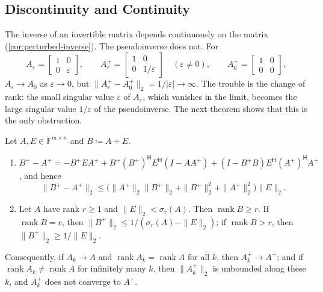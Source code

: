 \subsection{Discontinuity and Continuity}
\label{sec:pinv-continuity}

The inverse of an invertible matrix depends continuously on the matrix (\cref{cor:perturbed-inverse}). The pseudoinverse does not. For
\[
A_\varepsilon=\begin{bmatrix}1&0\\0&\varepsilon\end{bmatrix},\qquad A_\varepsilon^+=\begin{bmatrix}1&0\\0&1/\varepsilon\end{bmatrix}\quad(\varepsilon\ne0),\qquad A_0^+=\begin{bmatrix}1&0\\0&0\end{bmatrix},
\]
$A_\varepsilon\to A_0$ as $\varepsilon\to0$, but $\|A_\varepsilon^+-A_0^+\|_2=1/|\varepsilon|\to\infty$. The trouble is the change of rank: the small singular value $\varepsilon$ of $A_\varepsilon$, which vanishes in the limit, becomes the large singular value $1/\varepsilon$ of the pseudoinverse. The next theorem shows that this is the only obstruction.

\begin{theorem}
\label{thm:pinv-perturbation}
Let $A,E\in\mathbb F^{m\times n}$ and $B\coloneqq A+E$.
\begin{enumerate}
\item $B^+-A^+=-B^+EA^+ +B^+(B^+)^{\mathsf H}E^{\mathsf H}(I-AA^+)+(I-B^+B)E^{\mathsf H}(A^+)^{\mathsf H}A^+$, and hence
\[
\|B^+-A^+\|_2\le\bigl(\|A^+\|_2\|B^+\|_2+\|B^+\|_2^2+\|A^+\|_2^2\bigr)\|E\|_2 .
\]
\item Let $A$ have rank $r\ge1$ and $\|E\|_2<\sigma_r(A)$. Then $\operatorname{rank}B\ge r$. If $\operatorname{rank}B=r$, then $\|B^+\|_2\le1/(\sigma_r(A)-\|E\|_2)$; if $\operatorname{rank}B>r$, then $\|B^+\|_2\ge1/\|E\|_2$.
\end{enumerate}
Consequently, if $A_k\to A$ and $\operatorname{rank}A_k=\operatorname{rank}A$ for all $k$, then $A_k^+\to A^+$; and if $\operatorname{rank}A_k\ne\operatorname{rank}A$ for infinitely many $k$, then $\|A_k^+\|_2$ is unbounded along these $k$, and $A_k^+$ does not converge to $A^+$.
\end{theorem}

